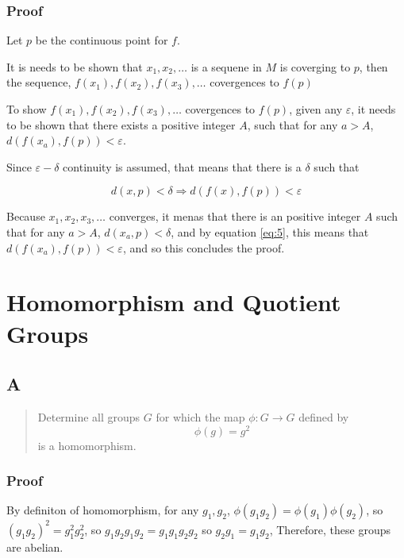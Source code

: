 \documentclass[11pt]{article}
\begin{document}
\subsubsection{Proof}
\label{sec:org063b218}
Let \(p\) be the continuous point for \(f\).

It is needs to be shown that  \(x_1, x_2, \ldots\) is a sequene in \(M\) is
coverging to \(p\), then the sequence, \(f(x_1), f(x_2), f(x_3), \ldots\)
covergences to \(f(p)\)


To show \(f(x_1), f(x_2), f(x_3), \ldots\)
covergences to \(f(p)\), given any \(\varepsilon\), it needs to be shown that there
exists a positive integer \(A\), such that for any \(a > A\), \(d(f(x_a), f(p)) < \varepsilon\).

Since \(\varepsilon -\delta\) continuity is assumed, that means that there is a
\(\delta\) such that

\begin{equation}
\label{eq:5}
d(x, p) < \delta \Rightarrow d(f(x), f(p)) < \varepsilon
\end{equation}

Because \(x_1, x_2, x_3, \ldots\) converges, it menas that there is an
positive integer \(A\) such that for any \(a > A\), \(d(x_{a}, p) < \delta\), and by equation
\ref{eq:5}, this means that \(d(f(x_{a}), f(p)) < \varepsilon\), and so this
concludes the proof.




\section{Homomorphism and Quotient Groups}
\label{sec:org28565e9}
\subsection{A}
\label{sec:org0282a80}

\begin{quote}
Determine all groups \(G\) for which the map \(\phi : G \rightarrow G\) defined by
\begin{equation}
\label{eq:1}
\phi(g) = g^{2}
\end{equation}
is a homomorphism.
\end{quote}
\subsubsection{Proof}
\label{sec:org61e94b6}
By definiton of homomorphism, for any \(g_1, g_2\), \(\phi(g_1 g_2) =
\phi(g_{1}) \phi(g_{2})\), so \((g_1 g_{2})^{2}  =
g_{1}^{2} g_{2}^{2}\), so \(g_1 g_2 g_1 g_2 = g_1 g_1 g_2 g_2\) so \(g_2 g_1 =
g_1 g_2\), Therefore, these groups are abelian.
\end{document}
